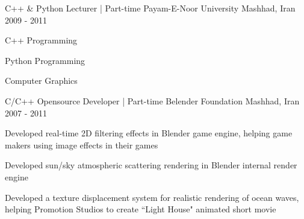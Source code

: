 \begin{cventries}
      \cventry
      {C++ \& Python Lecturer | Part-time} %
      {Payam-E-Noor University} %
      {Mashhad, Iran} %
      {2009 - 2011} %
      {
        \begin{cvitems} %
          \item {C++ Programming}
          \item {Python Programming}
          \item {Computer Graphics}
        \end{cvitems}
        }
        
        \cventry
        {C/C++ Opensource Developer | Part-time} %
        {Belender Foundation} %
        {Mashhad, Iran} %
        {2007 - 2011} %
        {
          \begin{cvitems} %
            \item {Developed real-time 2D filtering effects in Blender game engine, helping game makers using image effects in their games}
            \item {Developed sun/sky atmospheric scattering rendering in Blender internal render engine}
            \item {Developed a texture displacement system for realistic rendering of ocean waves, helping Promotion Studios to create ``Light House" animated short movie}
          \end{cvitems}
      }

\end{cventries}
